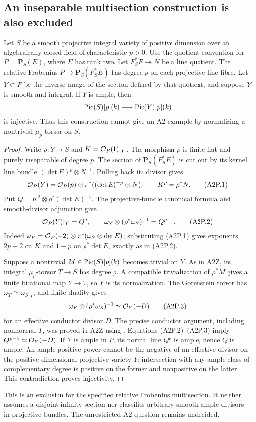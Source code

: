 \subsection{An inseparable multisection construction is also excluded}
\begin{proposition}
Let $S$ be a smooth projective integral variety of positive dimension
over an algebraically closed field of characteristic $p>0$.
Use the quotient convention for $P=\mathbf P_S(E)$, where $E$ has
rank two. Let $F_S^*E\twoheadrightarrow N$ be a line quotient.
The relative Frobenius
$P\to\mathbf P_S(F_S^*E)$ has degree $p$ on each projective-line
fibre. Let $Y\subset P$ be the inverse image of the section
defined by that quotient, and suppose $Y$ is smooth and integral.
If $Y$ is ample, then
\[
       \operatorname{Pic}(S)[p](k)\longrightarrow\operatorname{Pic}(Y)[p](k)
\]
is injective. Thus this construction cannot give an A2 example
by normalizing a nontrivial $\mu_p$-torsor on $S$.
\end{proposition}
\begin{proof}
Write $\rho:Y\to S$ and $K=\mathcal O_P(1)|_Y$. The morphism $\rho$
is finite flat and purely inseparable of degree $p$. The section
of $\mathbf P_S(F_S^*E)$ is cut out by its kernel line bundle
$(\det E)^p\otimes N^{-1}$. Pulling back its divisor gives
\[
 \mathcal O_P(Y)=\mathcal O_P(p)\otimes
                 \pi^*((\det E)^{-p}\otimes N),
 \qquad K^p=\rho^*N.                                  \tag{A2P.1}
\]
Put $Q=K^2\otimes\rho^*(\det E)^{-1}$. The projective-bundle
canonical formula and smooth-divisor adjunction give
\[
 \mathcal O_P(Y)|_Y=Q^p,\qquad
 \omega_Y\otimes(\rho^*\omega_S)^{-1}=Q^{p-1}.          \tag{A2P.2}
\]
Indeed $\omega_P=\mathcal O_P(-2)\otimes\pi^*(\omega_S\otimes\det E)$;
substituting (A2P.1) gives exponents $2p-2$ on $K$ and $1-p$
on $\rho^*\det E$, exactly as in (A2P.2).

Suppose a nontrivial $M\in\operatorname{Pic}(S)[p](k)$ becomes trivial on $Y$.
As in A2Z, its integral $\mu_p$-torsor $T\to S$ has degree $p$.
A compatible trivialization of $\rho^*M$ gives a finite birational
map $Y\to T$, so $Y$ is its normalization. The Gorenstein torsor
has $\omega_T\simeq\omega_S|_T$, and finite duality gives
\[
        \omega_Y\otimes(\rho^*\omega_S)^{-1}
                    \simeq\mathcal O_Y(-D)                         \tag{A2P.3}
\]
for an effective conductor divisor $D$. The precise conductor
argument, including nonnormal $T$, was proved in A2Z using
\cite[Lemma 47.15.8]{DGJ_StacksFiniteDuality}.
Equations (A2P.2)--(A2P.3) imply $Q^{p-1}\simeq\mathcal O_Y(-D)$.
If $Y$ is ample in $P$, its normal line $Q^p$ is ample, hence
$Q$ is ample. An ample positive power cannot be the negative of
an effective divisor on the positive-dimensional projective
variety $Y$: intersection with any ample class of complementary
degree is positive on the former and nonpositive on the latter.
This contradiction proves injectivity.
\end{proof}

This is an exclusion for the specified relative Frobenius
multisection. It neither assumes a disjoint infinity section nor
classifies arbitrary smooth ample divisors in projective bundles.
The unrestricted A2 question remains undecided.
